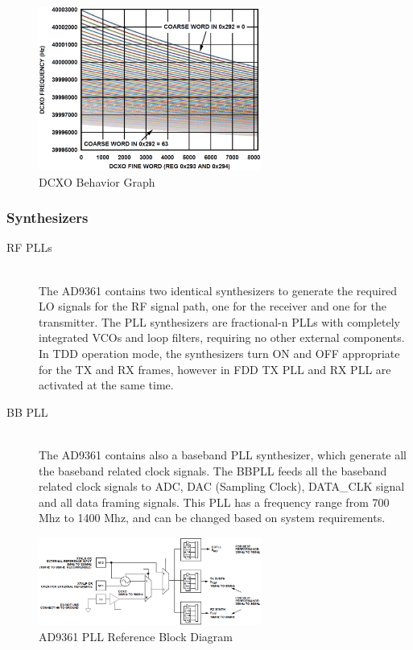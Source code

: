 \begin{figure}[htbp]
    \centering
    \includegraphics[width=0.65\textwidth]{./figures/dcxo_graph}
    \caption{ DCXO Behavior Graph
    \label{fig:pll}}
\end{figure}

\subsubsection{Synthesizers}

\begin{description}
	\item[RF PLLs] \hfill \\
	The AD9361 contains two identical synthesizers to generate the required LO signals for the RF signal path, one for the receiver and one for the transmitter. The PLL synthesizers are fractional-n PLLs with completely integrated VCOs and loop filters, requiring no other external components. In TDD operation mode, the synthesizers turn ON and OFF appropriate for the TX and RX frames, however in FDD TX PLL and RX PLL are activated at the same time.

	\item[BB PLL] \hfill \\
	The AD9361 contains also a baseband PLL synthesizer, which generate all the baseband related clock signals. The BBPLL feeds all the baseband related clock signals to ADC, DAC (Sampling Clock), DATA\_CLK signal and all data framing signals. This PLL has a frequency range from 700 Mhz to 1400 Mhz, and can be changed based on system requirements.

\end{description}

\begin{figure}[htbp]
    \centering
    \includegraphics[width=0.65\textwidth]{./figures/pll_ref_block}
    \caption{ AD9361 PLL Reference Block Diagram
    \label{fig:pll}}
\end{figure}

